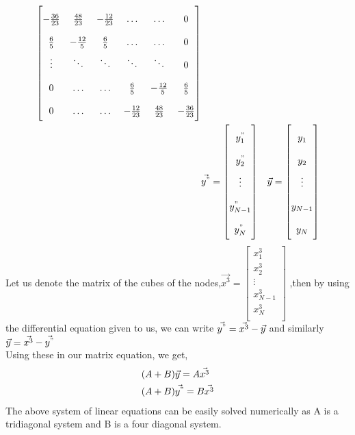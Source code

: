 \documentclass[letterpaper]{exam}
\begin{document}
\begin{questions}
\begin{parts}
\begin{solution}
\begin{align*}
\begin{bmatrix}
    -\frac{36}{23}&\frac{48}{23}&-\frac{12}{23}&\ldots&\ldots&0\\
    \frac{6}{5}&-\frac{12}{5}&\frac{6}{5}&\ldots&\ldots&0\\
    \vdots&\ddots&\ddots&\ddots&\ddots&0\\
    0&\ldots&\ldots&\frac{6}{5}&-\frac{12}{5}&\frac{6}{5}\\
    0&\ldots&\ldots&-\frac{12}{23}&\frac{48}{23}&-\frac{36}{23}
    \end{bmatrix}\\
    &\vec{y^{"}} = \renewcommand{\arraystretch}{2}\begin{bmatrix}
    y^{"}_1\\
    y^{"}_2\\
    \vdots\\
    y^{"}_{N-1}\\
    y^{"}_{N}\\
    \end{bmatrix}
    &\vec{y} = \renewcommand{\arraystretch}{2}\begin{bmatrix}
    y_1\\
    y_2\\
    \vdots\\
    y_{N-1}\\
    y_{N}\\
    \end{bmatrix}
\end{align*}
Let us denote the matrix of the cubes of the nodes,$\vec{x^3} = \begin{bmatrix}
x^3_1\\
    x^3_2\\
    \vdots\\
    x^{3}_{N-1}\\
    x^{3}_{N}\\
\end{bmatrix}$
,then by using the differential equation given to us, we can write $\vec{y^{"}} = \vec{x^3} - \vec{y}$ and similarly $\vec{y} = \vec{x^3} - \vec{y^{"}}$ \\
Using these in our matrix equation, we get,
\begin{align}\label{7}
    &(A+B)\vec{y} = A\vec{x^3}\\
    &(A+B)\vec{y^{"}} = B\vec{x^3}
\end{align}
The above system of linear equations can be easily solved numerically as A is a tridiagonal system and B is a four diagonal system.
\end{solution}

\end{parts}
\end{questions}
\end{document}
